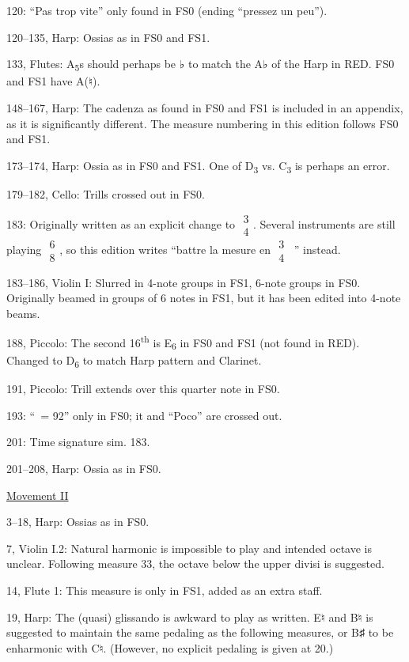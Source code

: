\documentclass[twoside]{article}
\begin{document}
\begin{hangparas}{15pt}{1}
\begin{multicols}{2}
120: ``Pas trop vite'' only found in FS0 (ending ``pressez un peu'').

120--135, Harp: Ossias as in FS0 and FS1.

133, Flutes: A\textsubscript{5}s should perhaps be ♭ to match the A♭ of the Harp in RED. FS0 and FS1 have A(♮).

148--167, Harp: The cadenza as found in FS0 and FS1 is included in an appendix, as it is significantly different. The measure numbering in this edition follows FS0 and FS1.

173--174, Harp: Ossia as in FS0 and FS1. One of D\textsubscript{3} vs. C\textsubscript{3} is perhaps an error.

179--182, Cello: Trills crossed out in FS0.

183: Originally written as an explicit change to $\substack{3\\4}$. Several instruments are still playing $\substack{6\\8}$, so this edition writes ``battre la mesure en $\substack{3\\4}$\ '' instead.

183--186, Violin I: Slurred in 4-note groups in FS1, 6-note groups in FS0. Originally beamed in groups of 6 notes in FS1, but it has been edited into 4-note beams.

188, Piccolo: The second 16\textsuperscript{th} is E\textsubscript{6} in FS0 and FS1 (not found in RED). Changed to D\textsubscript{6} to match Harp pattern and Clarinet.

191, Piccolo: Trill extends over this quarter note in FS0.

193: ``\Vier\ = 92'' only in FS0; it and ``Poco'' are crossed out.

201: Time signature sim. 183.

201--208, Harp: Ossia as in FS0.

\underline{Movement II}

3--18, Harp: Ossias as in FS0.

7, Violin I.2: Natural harmonic is impossible to play and intended octave is unclear. Following measure 33, the octave below the upper divisi is suggested.

14, Flute 1: This measure is only in FS1, added as an extra staff.

19, Harp: The (quasi) glissando is awkward to play as written. E♮ and B♮ is suggested to maintain the same pedaling as the following measures, or B♯ to be enharmonic with C♮. (However, no explicit pedaling is given at 20.)


\end{multicols}
\end{hangparas}
\end{document}
